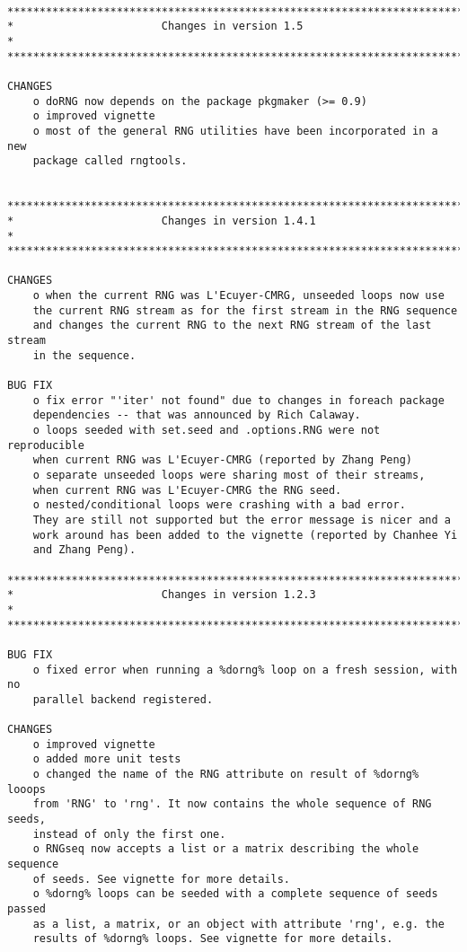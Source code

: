 \documentclass[a4paper,12pt]{article}\usepackage{graphicx, color}
\begin{document}
{\scriptsize
\begin{verbatim}

*************************************************************************
*                       Changes in version 1.5                          *
*************************************************************************

CHANGES
    o doRNG now depends on the package pkgmaker (>= 0.9)
    o improved vignette
    o most of the general RNG utilities have been incorporated in a new
    package called rngtools.
    

*************************************************************************
*                       Changes in version 1.4.1                        *
*************************************************************************

CHANGES
    o when the current RNG was L'Ecuyer-CMRG, unseeded loops now use 
    the current RNG stream as for the first stream in the RNG sequence 
    and changes the current RNG to the next RNG stream of the last stream 
    in the sequence. 

BUG FIX
    o fix error "'iter' not found" due to changes in foreach package 
    dependencies -- that was announced by Rich Calaway.
    o loops seeded with set.seed and .options.RNG were not reproducible
    when current RNG was L'Ecuyer-CMRG (reported by Zhang Peng)
    o separate unseeded loops were sharing most of their streams, 
    when current RNG was L'Ecuyer-CMRG the RNG seed.
    o nested/conditional loops were crashing with a bad error. 
    They are still not supported but the error message is nicer and a 
    work around has been added to the vignette (reported by Chanhee Yi 
    and Zhang Peng).

*************************************************************************
*                       Changes in version 1.2.3                        *
*************************************************************************

BUG FIX
    o fixed error when running a %dorng% loop on a fresh session, with no  
    parallel backend registered.  

CHANGES
    o improved vignette
    o added more unit tests
    o changed the name of the RNG attribute on result of %dorng% looops 
    from 'RNG' to 'rng'. It now contains the whole sequence of RNG seeds, 
    instead of only the first one.
    o RNGseq now accepts a list or a matrix describing the whole sequence 
    of seeds. See vignette for more details.
    o %dorng% loops can be seeded with a complete sequence of seeds passed 
    as a list, a matrix, or an object with attribute 'rng', e.g. the 
    results of %dorng% loops. See vignette for more details.
    

\end{verbatim}}
\end{document}
